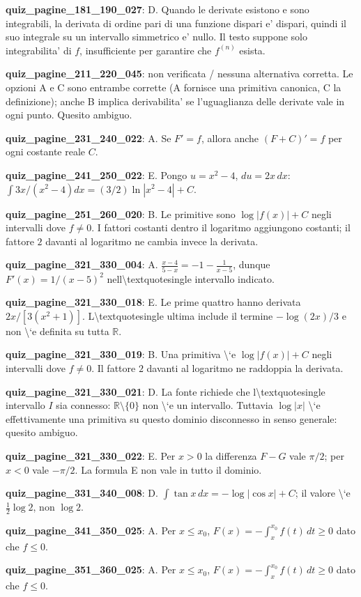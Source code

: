 \documentclass[11pt,a4paper]{article}
\newcounter{quiz}
\begin{document}
\noindent\textbf{quiz\_pagine\_181\_190\_027}: D. Quando le derivate esistono e sono integrabili, la derivata di ordine pari di una funzione dispari e' dispari, quindi il suo integrale su un intervallo simmetrico e' nullo. Il testo suppone solo integrabilita' di $f$, insufficiente per garantire che $f^{(n)}$ esista.\par\medskip
\noindent\textbf{quiz\_pagine\_211\_220\_045}: non verificata / nessuna alternativa corretta. Le opzioni A e C sono entrambe corrette (A fornisce una primitiva canonica, C la definizione); anche B implica derivabilita' se l'uguaglianza delle derivate vale in ogni punto. Quesito ambiguo.\par\medskip
\noindent\textbf{quiz\_pagine\_231\_240\_022}: A. Se $F\prime=f$, allora anche $(F+C)\prime=f$ per ogni costante reale $C$.\par\medskip
\noindent\textbf{quiz\_pagine\_241\_250\_022}: E. Pongo $u=x^2-4$, $du=2x\,dx$: $\int3x/(x^2-4)dx=(3/2)\ln|x^2-4|+C$.\par\medskip
\noindent\textbf{quiz\_pagine\_251\_260\_020}: B. Le primitive sono $\log|f(x)|+C$ negli intervalli dove $f\ne0$. I fattori costanti dentro il logaritmo aggiungono costanti; il fattore $2$ davanti al logaritmo ne cambia invece la derivata.\par\medskip
\noindent\textbf{quiz\_pagine\_321\_330\_004}: A. $\frac{x-4}{5-x}=-1-\frac1{x-5}$, dunque $F\prime(x)=1/(x-5)^2$ nell\textbackslash{}textquotesingle intervallo indicato.\par\medskip
\noindent\textbf{quiz\_pagine\_321\_330\_018}: E. Le prime quattro hanno derivata $2x/[3(x^2+1)]$. L\textbackslash{}textquotesingle ultima include il termine $-\log(2x)/3$ e non \textbackslash{}`e definita su tutta $\mathbb R$.\par\medskip
\noindent\textbf{quiz\_pagine\_321\_330\_019}: B. Una primitiva \textbackslash{}`e $\log|f(x)|+C$ negli intervalli dove $f\neq0$. Il fattore $2$ davanti al logaritmo ne raddoppia la derivata.\par\medskip
\noindent\textbf{quiz\_pagine\_321\_330\_021}: D. La fonte richiede che l\textbackslash{}textquotesingle intervallo $I$ sia connesso: $\mathbb R\setminus\{0\}$ non \textbackslash{}`e un intervallo. Tuttavia $\log|x|$ \textbackslash{}`e effettivamente una primitiva su questo dominio disconnesso in senso generale: quesito ambiguo.\par\medskip
\noindent\textbf{quiz\_pagine\_321\_330\_022}: E. Per $x>0$ la differenza $F-G$ vale $\pi/2$; per $x<0$ vale $-\pi/2$. La formula E non vale in tutto il dominio.\par\medskip
\noindent\textbf{quiz\_pagine\_331\_340\_008}: D. $\int\tan x\,dx=-\log|\cos x|+C$; il valore \textbackslash{}`e $\frac12\log2$, non $\log2$.\par\medskip
\noindent\textbf{quiz\_pagine\_341\_350\_025}: A. Per $x\leq x_0$, $F(x)=-\int_x^{x_0}f(t)\,dt\geq0$ dato che $f\leq0$.\par\medskip
\noindent\textbf{quiz\_pagine\_351\_360\_025}: A. Per $x\leq x_0$, $F(x)=-\int_x^{x_0}f(t)\,dt\geq0$ dato che $f\leq0$.\par\medskip
\end{document}
